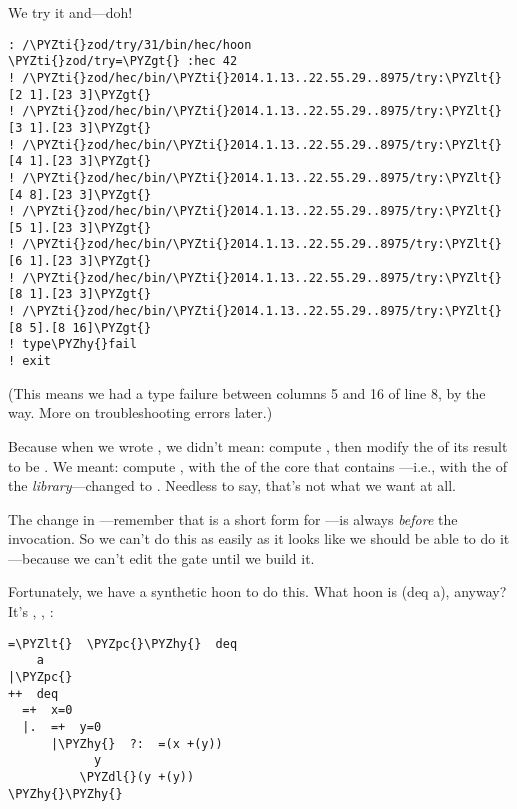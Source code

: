 We try it and---doh!

\begin{framed_shaded}
\begin{Verbatim}[fontsize=\relsize{-2.5},fontseries=b,commandchars=\\\{\}]
: /\PYZti{}zod/try/31/bin/hec/hoon
\PYZti{}zod/try=\PYZgt{} :hec 42
! /\PYZti{}zod/hec/bin/\PYZti{}2014.1.13..22.55.29..8975/try:\PYZlt{}[2 1].[23 3]\PYZgt{}
! /\PYZti{}zod/hec/bin/\PYZti{}2014.1.13..22.55.29..8975/try:\PYZlt{}[3 1].[23 3]\PYZgt{}
! /\PYZti{}zod/hec/bin/\PYZti{}2014.1.13..22.55.29..8975/try:\PYZlt{}[4 1].[23 3]\PYZgt{}
! /\PYZti{}zod/hec/bin/\PYZti{}2014.1.13..22.55.29..8975/try:\PYZlt{}[4 8].[23 3]\PYZgt{}
! /\PYZti{}zod/hec/bin/\PYZti{}2014.1.13..22.55.29..8975/try:\PYZlt{}[5 1].[23 3]\PYZgt{}
! /\PYZti{}zod/hec/bin/\PYZti{}2014.1.13..22.55.29..8975/try:\PYZlt{}[6 1].[23 3]\PYZgt{}
! /\PYZti{}zod/hec/bin/\PYZti{}2014.1.13..22.55.29..8975/try:\PYZlt{}[8 1].[23 3]\PYZgt{}
! /\PYZti{}zod/hec/bin/\PYZti{}2014.1.13..22.55.29..8975/try:\PYZlt{}[8 5].[8 16]\PYZgt{}
! type\PYZhy{}fail
! exit
\end{Verbatim}
\end{framed_shaded}
(This means we had a type failure between columns 5 and 16 of line
8, by the way.  More on troubleshooting errors later.)

Because when we wrote , we didn't mean: compute ,
then modify the \kode{+\textless{}} of its result to be .  We meant: compute
, with the \kode{+\textless{}} of the core that contains ---i.e., with
the \kode{+\textless{}} of the \emph{library}---changed to .  Needless to say,
that's not what we want at all.

The change in \kode{=\%}---remember that  is a short form
for ---is always \emph{before} the invocation.
So we can't do this as easily as it looks like we should be able
to do it---because we can't edit the gate until we build it.

Fortunately, we have a synthetic hoon to do this.  What hoon is
(deq a), anyway?  It's \kode{\%-}, , :
\begin{framed_shaded}
\begin{Verbatim}[fontsize=\relsize{-2.5},fontseries=b,commandchars=\\\{\}]
=\PYZlt{}  \PYZpc{}\PYZhy{}  deq
    a
|\PYZpc{}
++  deq
  =+  x=0
  |.  =+  y=0
      |\PYZhy{}  ?:  =(x +(y))
            y
          \PYZdl{}(y +(y))
\PYZhy{}\PYZhy{}
\end{Verbatim}
\end{framed_shaded}

